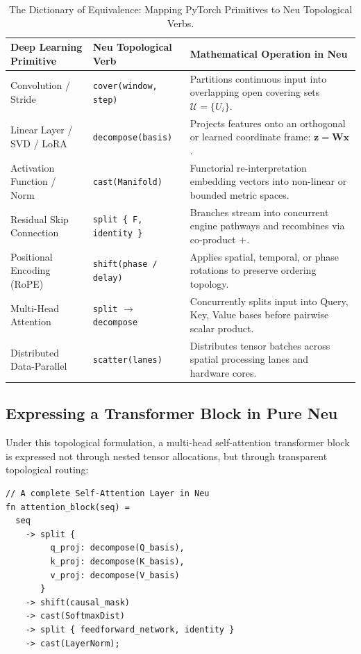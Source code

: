 \documentclass[11pt]{article}
\begin{document}
\begin{table}[htbp]
\centering
\small
\begin{tabularx}{\linewidth}{llX}
\toprule
\textbf{Deep Learning Primitive} & \textbf{Neu Topological Verb} & \textbf{Mathematical Operation in Neu} \\
\midrule
Convolution / Stride & \texttt{cover(window, step)} & Partitions continuous input into overlapping open covering sets $\mathcal{U} = \{U_i\}$. \\
Linear Layer / SVD / LoRA & \texttt{decompose(basis)} & Projects features onto an orthogonal or learned coordinate frame: $\mathbf{z} = \mathbf{W}\mathbf{x}$. \\
Activation Function / Norm & \texttt{cast(Manifold)} & Functorial re-interpretation embedding vectors into non-linear or bounded metric spaces. \\
Residual Skip Connection & \texttt{split \{ F, identity \}} & Branches stream into concurrent engine pathways and recombines via co-product $+$. \\
Positional Encoding (RoPE) & \texttt{shift(phase / delay)} & Applies spatial, temporal, or phase rotations to preserve ordering topology. \\
Multi-Head Attention & \texttt{split} $\to$ \texttt{decompose} & Concurrently splits input into Query, Key, Value bases before pairwise scalar product. \\
Distributed Data-Parallel & \texttt{scatter(lanes)} & Distributes tensor batches across spatial processing lanes and hardware cores. \\
\bottomrule
\end{tabularx}
\caption{The Dictionary of Equivalence: Mapping PyTorch Primitives to Neu Topological Verbs.}
\label{tab:torch_to_neu}
\end{table}

\subsection{Expressing a Transformer Block in Pure Neu}
Under this topological formulation, a multi-head self-attention transformer block is expressed not through nested tensor allocations, but through transparent topological routing:

\begin{lstlisting}[language=neu]
// A complete Self-Attention Layer in Neu
fn attention_block(seq) = 
  seq 
    -> split { 
         q_proj: decompose(Q_basis), 
         k_proj: decompose(K_basis), 
         v_proj: decompose(V_basis) 
       }
    -> shift(causal_mask)
    -> cast(SoftmaxDist)
    -> split { feedforward_network, identity }
    -> cast(LayerNorm);
\end{lstlisting}
\end{document}
